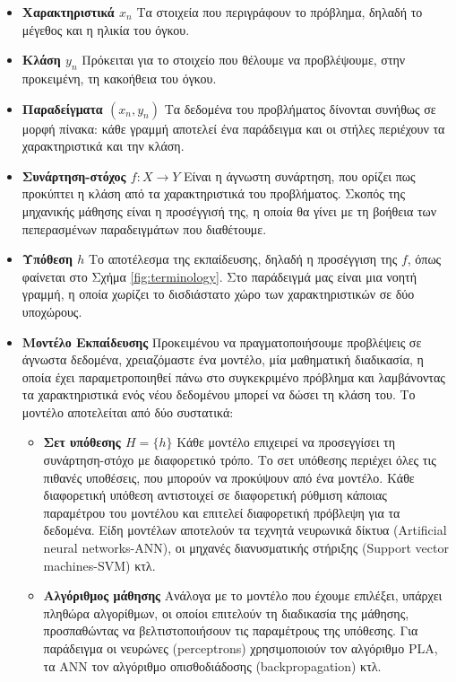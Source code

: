 \begin{itemize}
	\item \textbf{Χαρακτηριστικά $x_n$} Τα στοιχεία που περιγράφουν το πρόβλημα, δηλαδή το μέγεθος και η ηλικία του όγκου.
	\item \textbf{Κλάση $y_n$} Πρόκειται για το στοιχείο που θέλουμε να προβλέψουμε, στην προκειμένη, τη κακοήθεια του όγκου.
	\item \textbf{Παραδείγματα $(x_n, y_n)$} Τα δεδομένα του προβλήματος δίνονται συνήθως σε μορφή πίνακα: κάθε γραμμή αποτελεί ένα παράδειγμα και οι στήλες περιέχουν τα χαρακτηριστικά και την κλάση.
	\item \textbf{Συνάρτηση-στόχος $f: X \rightarrow Y$} Είναι η άγνωστη συνάρτηση, που ορίζει πως προκύπτει η κλάση από τα χαρακτηριστικά του προβλήματος. Σκοπός της μηχανικής μάθησης είναι η προσέγγισή της, η οποία θα γίνει με τη βοήθεια των πεπερασμένων παραδειγμάτων που διαθέτουμε.
	\item \textbf{Υπόθεση $h$} Το αποτέλεσμα της εκπαίδευσης, δηλαδή η προσέγγιση της $f$, όπως φαίνεται στο Σχήμα \ref{fig:terminology}. Στο παράδειγμά μας είναι μια νοητή γραμμή, η οποία χωρίζει το δισδιάστατο χώρο των χαρακτηριστικών σε δύο υποχώρους.
	\item \textbf{Μοντέλο Εκπαίδευσης} Προκειμένου να πραγματοποιήσουμε προβλέψεις σε άγνωστα δεδομένα, χρειαζόμαστε ένα μοντέλο, μία μαθηματική διαδικασία, η οποία έχει παραμετροποιηθεί πάνω στο συγκεκριμένο πρόβλημα και λαμβάνοντας τα χαρακτηριστικά ενός νέου δεδομένου μπορεί να δώσει τη κλάση του. Το μοντέλο αποτελείται από δύο συστατικά:
	\begin{itemize}
		\item \textbf{Σετ υπόθεσης $H = \{h\}$} Κάθε μοντέλο επιχειρεί να προσεγγίσει τη συνάρτηση-στόχο με διαφορετικό τρόπο. Το σετ υπόθεσης περιέχει όλες τις πιθανές υποθέσεις, που μπορούν να προκύψουν από ένα μοντέλο. Κάθε διαφορετική υπόθεση αντιστοιχεί σε διαφορετική ρύθμιση κάποιας παραμέτρου του μοντέλου και επιτελεί διαφορετική πρόβλεψη για τα δεδομένα. Είδη μοντέλων αποτελούν τα τεχνητά νευρωνικά δίκτυα (Artificial neural networks-ANN), οι μηχανές διανυσματικής στήριξης (Support vector machines-SVM) κτλ.
		\item \textbf{Αλγόριθμος μάθησης} Ανάλογα με το μοντέλο που έχουμε επιλέξει, υπάρχει πληθώρα αλγορίθμων, οι οποίοι επιτελούν τη διαδικασία της μάθησης, προσπαθώντας να βελτιστοποιήσουν τις παραμέτρους της υπόθεσης. Για παράδειγμα οι νευρώνες (perceptrons) χρησιμοποιούν τον αλγόριθμο PLA, τα \gls{ANN} τον αλγόριθμο οπισθοδιάδοσης (backpropagation) κτλ.    
	\end{itemize}
\end{itemize}


